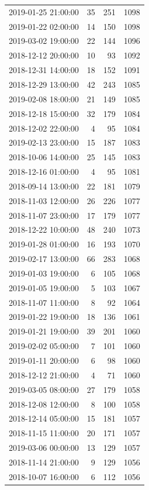 \begin{tabular}{lrrr}
2019-01-25 21:00:00 & 35 & 251 & 1098 \\
2019-01-22 02:00:00 & 14 & 150 & 1098 \\
2019-03-02 19:00:00 & 22 & 144 & 1096 \\
2018-12-12 20:00:00 & 10 & 93 & 1092 \\
2018-12-31 14:00:00 & 18 & 152 & 1091 \\
2018-12-29 13:00:00 & 42 & 243 & 1085 \\
2019-02-08 18:00:00 & 21 & 149 & 1085 \\
2018-12-18 15:00:00 & 32 & 179 & 1084 \\
2018-12-02 22:00:00 & 4 & 95 & 1084 \\
2019-02-13 23:00:00 & 15 & 187 & 1083 \\
2018-10-06 14:00:00 & 25 & 145 & 1083 \\
2018-12-16 01:00:00 & 4 & 95 & 1081 \\
2018-09-14 13:00:00 & 22 & 181 & 1079 \\
2018-11-03 12:00:00 & 26 & 226 & 1077 \\
2018-11-07 23:00:00 & 17 & 179 & 1077 \\
2018-12-22 10:00:00 & 48 & 240 & 1073 \\
2019-01-28 01:00:00 & 16 & 193 & 1070 \\
2019-02-17 13:00:00 & 66 & 283 & 1068 \\
2019-01-03 19:00:00 & 6 & 105 & 1068 \\
2019-01-05 19:00:00 & 5 & 103 & 1067 \\
2018-11-07 11:00:00 & 8 & 92 & 1064 \\
2019-01-22 19:00:00 & 18 & 136 & 1061 \\
2019-01-21 19:00:00 & 39 & 201 & 1060 \\
2019-02-02 05:00:00 & 7 & 101 & 1060 \\
2019-01-11 20:00:00 & 6 & 98 & 1060 \\
2018-12-12 21:00:00 & 4 & 71 & 1060 \\
2019-03-05 08:00:00 & 27 & 179 & 1058 \\
2018-12-08 12:00:00 & 8 & 100 & 1058 \\
2018-12-14 05:00:00 & 15 & 181 & 1057 \\
2018-11-15 11:00:00 & 20 & 171 & 1057 \\
2019-03-06 00:00:00 & 13 & 129 & 1057 \\
2018-11-14 21:00:00 & 9 & 129 & 1056 \\
2018-10-07 16:00:00 & 6 & 112 & 1056 \\

\end{tabular}
